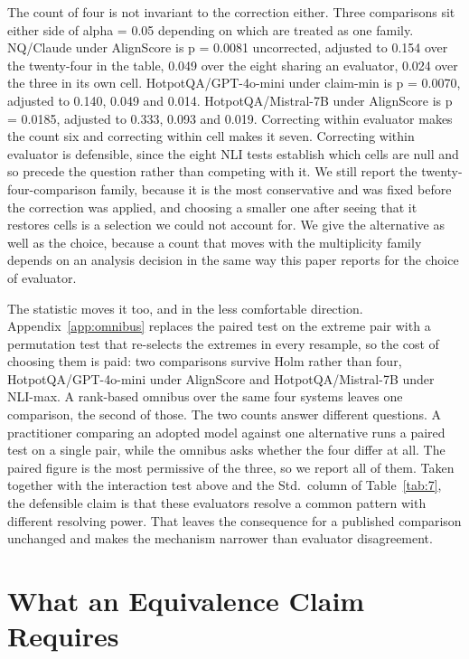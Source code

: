 \documentclass[11pt]{article}
\newcommand{\movableblock}[1]{}             %
\newcommand{\movableblock}[1]{}
\begin{document}
The count of four is not invariant to the correction either. Three comparisons sit either side of alpha = 0.05 depending on which are treated as one family. NQ/Claude under AlignScore is p = 0.0081 uncorrected, adjusted to 0.154 over the twenty-four in the table, 0.049 over the eight sharing an evaluator, 0.024 over the three in its own cell. HotpotQA/GPT-4o-mini under claim-min is p = 0.0070, adjusted to 0.140, 0.049 and 0.014. HotpotQA/Mistral-7B under AlignScore is p = 0.0185, adjusted to 0.333, 0.093 and 0.019. Correcting within evaluator makes the count six and correcting within cell makes it seven. Correcting within evaluator is defensible, since the eight NLI tests establish which cells are null and so precede the question rather than competing with it. We still report the twenty-four-comparison family, because it is the most conservative and was fixed before the correction was applied, and choosing a smaller one after seeing that it restores cells is a selection we could not account for. We give the alternative as well as the choice, because a count that moves with the multiplicity family depends on an analysis decision in the same way this paper reports for the choice of evaluator.

The statistic moves it too, and in the less comfortable direction. Appendix~\ref{app:omnibus} replaces the paired test on the extreme pair with a permutation test that re-selects the extremes in every resample, so the cost of choosing them is paid: two comparisons survive Holm rather than four, HotpotQA/GPT-4o-mini under AlignScore and HotpotQA/Mistral-7B under NLI-max. A rank-based omnibus over the same four systems leaves one comparison, the second of those. The two counts answer different questions. A practitioner comparing an adopted model against one alternative runs a paired test on a single pair, while the omnibus asks whether the four differ at all. The paired figure is the most permissive of the three, so we report all of them. Taken together with the interaction test above and the Std.\ column of Table~\ref{tab:7}, the defensible claim is that these evaluators resolve a common pattern with different resolving power. That leaves the consequence for a published comparison unchanged and makes the mechanism narrower than evaluator disagreement.


\movableblock{sections/control}

\movableblock{sections/direction}

\movableblock{sections/normalisation}

\section{What an Equivalence Claim Requires}
\label{sec:equivalence}
\end{document}
